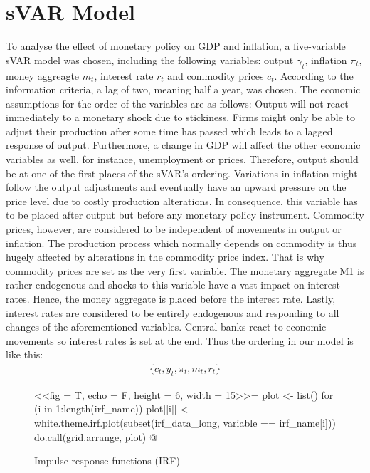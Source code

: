 \documentclass[11pt,a4paper]{report}
\begin{document}
\section{sVAR Model}
To analyse the effect of monetary policy on GDP and inflation, a five-variable sVAR model was chosen, including the following variables: output $\gamma_t$, inflation $\pi_t$, money aggreagte $m_t$, interest rate $r_t$ and commodity prices $c_t$. According to the information criteria, a lag of two, meaning half a year, was chosen.
\newline
The economic assumptions for the order of the variables are as follows: 
\newline
Output will not react immediately to a monetary shock due to stickiness. Firms might only be able to adjust their production after some time has passed which leads to a lagged response of output. Furthermore, a change in GDP will affect the other economic variables as well, for instance, unemployment or prices. Therefore, output should be at one of the first places of the sVAR's ordering.
\newline 
Variations in inflation might follow the output adjustments and eventually have an upward pressure on the price level due to costly production alterations. In consequence, this variable has to be placed after output but before any monetary policy instrument.
\newline
Commodity prices, however, are considered to be independent of movements in output or inflation. The  production  process  which  normally  depends  on  commodity  is  thus  hugely  affected by alterations in the commodity price index. That is why commodity prices are set as the very first variable.
\newline
The monetary aggregate M1 is rather endogenous and shocks to this variable have a vast impact on interest rates. Hence, the money aggregate is placed before the interest rate. 
\newline
Lastly, interest rates are considered to be entirely endogenous and responding to all changes of the aforementioned variables. Central banks react to economic movements so interest rates is set at the end.
\newline
\noindent Thus the ordering in our model is like this:
	\begin{eqnarray*}
		\{c_t, y_t, \pi_t, m_t, r_t \}
	\end{eqnarray*}




\begin{figure}[H]
\caption{Impulse response functions (IRF)}
\label{irf}
\centering
<<fig = T, echo = F, height = 6, width = 15>>=
plot <- list()
for (i in 1:length(irf_name)){
plot[[i]] <- white.theme.irf.plot(subset(irf_data_long, variable == irf_name[i]))
}
do.call(grid.arrange, plot)
@
\end{figure}
\end{document}
